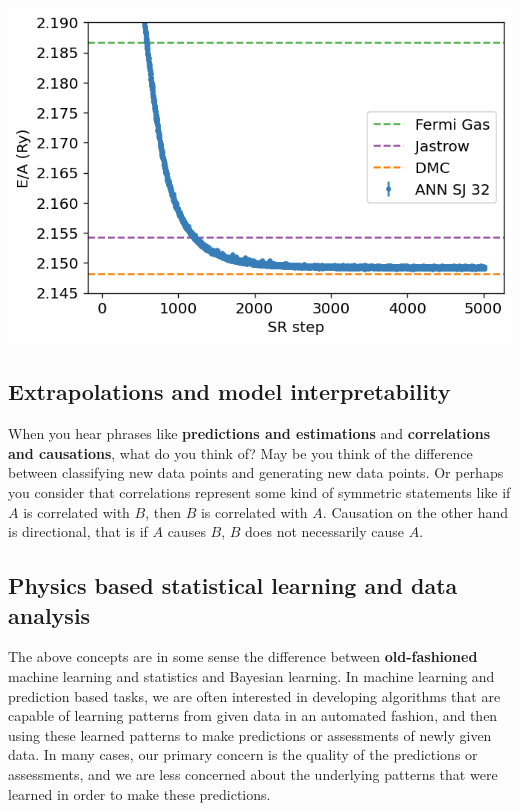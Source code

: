 \documentclass[%
oneside,                 %
final,                   %
10pt]{article}
\begin{document}
\begin{block}{}

\vspace{6mm}

\centerline{\includegraphics[width=0.9\linewidth]{figures/elgasnew.png}}

\vspace{6mm}

\end{block}

\subsection{Extrapolations and model interpretability}

When you hear phrases like \textbf{predictions and estimations} and
\textbf{correlations and causations}, what do you think of?  May be you think
of the difference between classifying new data points and generating
new data points.
Or perhaps you consider that correlations represent some kind of symmetric statements like
if $A$ is correlated with $B$, then $B$ is correlated with
$A$. Causation on the other hand is directional, that is if $A$ causes $B$, $B$ does not
necessarily cause $A$.

\subsection{Physics based statistical learning and data analysis}

The above concepts are in some sense the difference between \textbf{old-fashioned} machine
learning and statistics and Bayesian learning. In machine learning and prediction based
tasks, we are often interested in developing algorithms that are
capable of learning patterns from given data in an automated fashion,
and then using these learned patterns to make predictions or
assessments of newly given data. In many cases, our primary concern
is the quality of the predictions or assessments, and we are less
concerned about the underlying patterns that were learned in order
to make these predictions.
\end{document}
